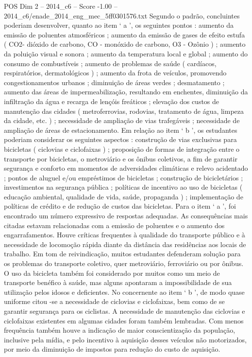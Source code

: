 \begin{textsample}{POS Dim 2 – 2014\_c6 – Score -1.00 – 2014\_c6/enade\_2014\_eng\_mec\_5ff0301576.txt}
Segundo o padrão, concluintes poderiam desenvolver, quanto ao item ‘ a ’, os seguintes pontos : aumento da emissão de poluentes atmosféricos ; aumento da emissão de gases de efeito estufa ( CO2- dióxido de carbono, CO - monóxido de carbono, O3 - Ozônio ) ; aumento da poluição visual e sonora ; aumento da temperatura local e global ; aumento do consumo de combustíveis ; aumento de problemas de saúde ( cardíacos, respiratórios, dermatológicos ) ; aumento da frota de veículos, promovendo congestionamentos urbanos ; diminuição de áreas verdes ; desmatamento ; aumento das áreas de impermeabilização, resultando em enchentes, diminuição da infiltração da água e recarga de lençóis freáticos ; elevação dos custos de manutenção das cidades ( metroferrovias, rodovias, tratamento de água, limpeza da cidade, etc. ) ; necessidade de ampliação de vias trafegáveis ; necessidade de ampliação de áreas de estacionamento.
Em relação ao item ‘ b ’, os estudantes poderiam considerar os seguintes aspectos : construção de vias exclusivas para bicicletas ( ciclovias e ciclofaixas ) ; proposição de formas de integração entre o transporte por bicicletas, o metroviário e os ônibus coletivos, a fim de garantir segurança e conforto em momentos de adversidades climáticas e relevo acidentado ; pontos de aluguel e/ou empréstimos de bicicletas ; construção de bicicletários ; investimentos na segurança pública ; políticas de incentivo ao uso de bicicletas ( educação ambiental, qualidade de vida, saúde, propaganda ) ; implementação de políticas de crédito e de redução de custos das bicicletas.
Para o item ‘ a ’, foi encontrado um número expressivo de respostas adequadas.
As consequências mais citadas estavam relacionadas com a emissão de poluentes e o aumento dos engarrafamentos.
Houve críticas frequentes à qualidade do transporte público e à necessidade de locomoção rápida diante da distância das residências aos locais de trabalho.
Em tom de reivindicação, muitos estudantes defenderam solução para os problemas do transporte coletivo, quer metroviário, ferroviário ou por ônibus.
O uso da bicicleta também foi considerado por muitos como um meio de transporte benéfico à saúde, mas alguns apontaram a impossibilidade de sua utilização pelos idosos e deficientes.
No concernente ao item ‘ b ’, de modo quase uniforme citou -se a necessidade de ciclovias e ciclofaixas, bem como de se garantir segurança para os ciclistas.
A necessidade de manutenção das ciclovias e ciclofaixas existentes em algumas cidades foram também lembradas.
Com menos frequência também houve a indicação de maior conscientização da população, inclusive pela mídia, e pelo incentivo à aquisição desses veículos não motorizados, por meio da diminuição de impostos para redução do custo de aquisição.

\end{textsample}
